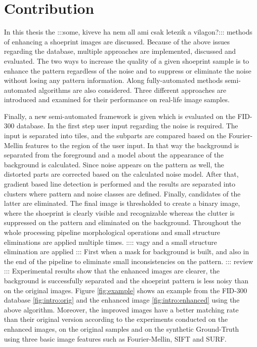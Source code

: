 \documentclass[draft,final]{vutinfth} %
\begin{document}
\section{Contribution}
\par
In this thesis the :::some, kiveve ha nem all ami csak letezik a vilagon?::: methods of enhancing a shoeprint images are discussed.
Because of the above issues regarding the database, multiple approaches are implemented, discussed and evaluated.
The two ways to increase the quality of a given shoeprint sample is to enhance the pattern regardless of the noise and to suppress or eliminate the noise without losing any pattern information.
Along fully-automated methods semi-automated algorithms are also considered.
Three different approaches are introduced and examined for their performance on real-life image samples.
\par
Finally, a new semi-automated framework is given which is evaluated on the FID-300 database.
In the first step user input regarding the noise is required.
The input is separated into tiles, and the subparts are compared based on the Fourier-Mellin features to the region of the user input.
In that way the background is separated from the foreground and a model about the appearance of the background is calculated.
Since noise appears on the pattern as well, the distorted parts are corrected based on the calculated noise model.
After that, gradient based line detection is performed and the results are separated into clusters where pattern and noise classes are defined. Finally, candidates of the latter are eliminated.
The final image is thresholded to create a binary image, where the shoeprint is clearly visible and recognizable whereas the clutter is suppressed on the pattern and eliminated on the background.
Throughout the whole processing pipeline morphological operations and small structure eliminations are applied multiple times. :::: vagy and a small structure elimination are applied :::
First when a mask for background is built, and also in the end of the pipeline to eliminate small inconsistencies on the pattern. ::: review :::
Experimental results show that the enhanced images are clearer, the background is successfully separated and the shoeprint pattern is less noisy than on the original images.
Figure \ref{fig:example} shows an example from the FID-300 database \ref{fig:intro:orig} and the enhanced image \ref{fig:intro:enhanced} using the above algorithm.
Moreover, the improved images have a better matching rate than their original version according to the experiments conducted on the enhanced images, on the original samples and on the synthetic Ground-Truth using three basic image features such as Fourier-Mellin, SIFT and SURF.
\end{document}
